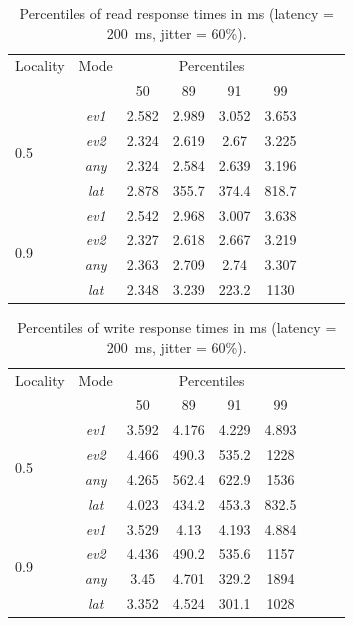 \documentclass[man,floatsintext,12pt]{apa6}
\begin{document}
\begin{table}[h!]
\caption{Percentiles of read response times in ms (latency = 200~ms, jitter = 60\%).}
\label{tab:percentiles_reads}
\begin{tabular}{lcccccccc} \toprule

Locality & Mode & \multicolumn{4}{c}{Percentiles}\\& & 50 & 89 & 91 & 99 \\
\midrule
\multirow{ 4}{*}{0.5}
& \textit{ev1} & 2.582 & 2.989 & 3.052 & 3.653 \\
& \textit{ev2} & 2.324 & 2.619 & 2.67 & 3.225 \\
& \textit{any} & 2.324 & 2.584 & 2.639 & 3.196 \\
& \textit{lat} & 2.878 & 355.7 & 374.4 & 818.7 \\
\hline
\multirow{ 4}{*}{0.9}
& \textit{ev1} & 2.542 & 2.968 & 3.007 & 3.638 \\
& \textit{ev2} & 2.327 & 2.618 & 2.667 & 3.219 \\
& \textit{any} & 2.363 & 2.709 & 2.74 & 3.307 \\
& \textit{lat} & 2.348 & 3.239 & 223.2 & 1130 \\
\bottomrule

\end{tabular}
\end{table}

\begin{table}[h!]
\caption{Percentiles of write response times in ms (latency = 200~ms, jitter = 60\%).}
\label{tab:percentiles_writes}
\begin{tabular}{lcccccccc} \toprule

Locality & Mode & \multicolumn{4}{c}{Percentiles}\\& & 50 & 89 & 91 & 99 \\ \midrule
\multirow{ 4}{*}{0.5}
& \textit{ev1} & 3.592 & 4.176 & 4.229 & 4.893 \\
& \textit{ev2} & 4.466 & 490.3 & 535.2 & 1228 \\
& \textit{any} & 4.265 & 562.4 & 622.9 & 1536 \\
& \textit{lat} & 4.023 & 434.2 & 453.3 & 832.5 \\
\hline
\multirow{ 4}{*}{0.9}
& \textit{ev1} & 3.529 & 4.13 & 4.193 & 4.884 \\
& \textit{ev2} & 4.436 & 490.2 & 535.6 & 1157 \\
& \textit{any} & 3.45 & 4.701 & 329.2 & 1894 \\
& \textit{lat} & 3.352 & 4.524 & 301.1 & 1028 \\
\bottomrule

\end{tabular}
\end{table}
\end{document}
